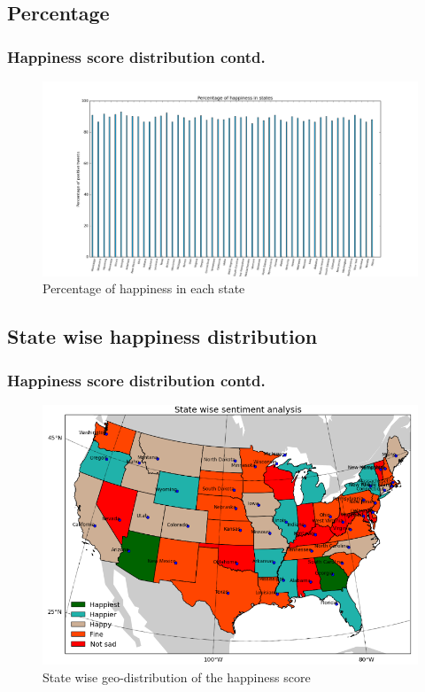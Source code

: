 \documentclass{beamer}
\begin{document}
\subsection{Percentage}
\begin{frame}
\frametitle{Happiness score distribution contd.}
\begin{figure}
\includegraphics[scale=0.25]{./Images/Percentage}
\caption{Percentage of happiness in each state}
\end{figure}
\end{frame}

\subsection{State wise happiness distribution}
\begin{frame}
\frametitle{Happiness score distribution contd.}
\begin{figure} 
\includegraphics[scale=0.38,center]{./Images/GeoPlotSnapshot}
\caption{State wise geo-distribution of the happiness score}
\end{figure}
\end{frame}
\end{document}
